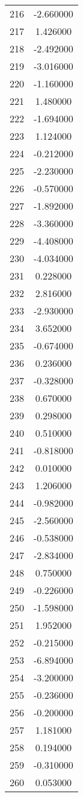 \documentclass[12pt]{article}
\begin{document}
\begin{longtable}{@{}cc@{}}
216 & -2.660000 \\
217 & 1.426000 \\
218 & -2.492000 \\
219 & -3.016000 \\
220 & -1.160000 \\
221 & 1.480000 \\
222 & -1.694000 \\
223 & 1.124000 \\
224 & -0.212000 \\
225 & -2.230000 \\
226 & -0.570000 \\
227 & -1.892000 \\
228 & -3.360000 \\
229 & -4.408000 \\
230 & -4.034000 \\
231 & 0.228000 \\
232 & 2.816000 \\
233 & -2.930000 \\
234 & 3.652000 \\
235 & -0.674000 \\
236 & 0.236000 \\
237 & -0.328000 \\
238 & 0.670000 \\
239 & 0.298000 \\
240 & 0.510000 \\
241 & -0.818000 \\
242 & 0.010000 \\
243 & 1.206000 \\
244 & -0.982000 \\
245 & -2.560000 \\
246 & -0.538000 \\
247 & -2.834000 \\
248 & 0.750000 \\
249 & -0.226000 \\
250 & -1.598000 \\
251 & 1.952000 \\
252 & -0.215000 \\
253 & -6.894000 \\
254 & -3.200000 \\
255 & -0.236000 \\
256 & -0.200000 \\
257 & 1.181000 \\
258 & 0.194000 \\
259 & -0.310000 \\
260 & 0.053000 \\

\end{longtable}
\end{document}
